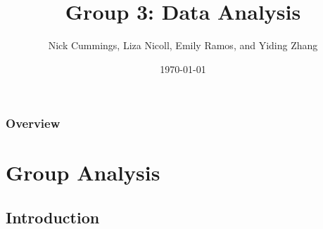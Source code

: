 \documentclass[table]{beamer}\usepackage[]{graphicx}\usepackage[]{color}
\title[Group3:Data Analysis]{Group 3: Data Analysis} %
\author[Emily, Liza, Nick and Yiding]{Nick Cummings, Liza Nicoll, Emily Ramos, and Yiding Zhang} %
\institute[UMASS] %
{
University of Massachusetts, Amherst \\ %
\medskip
}
\date{\today} %
\begin{document}

\begin{frame}
\titlepage %
\end{frame}

\begin{frame}
\frametitle{Overview} %
\tableofcontents %
\end{frame}


\section{Group Analysis} %

\subsection{Introduction} %
\end{document}

